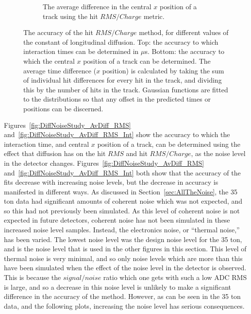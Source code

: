 \begin{figure}
\begin{subfigure}{0.6\textwidth}
    \caption{The average difference in the central $x$ position of a track using the hit $RMS/Charge$ metric.}
    \label{fig:DiffLDiff_AvDiff_RMS_Int_X}
  \end{subfigure}
  \caption[Comparing the accuracy of the hit $RMS$ method, as the constant of longitudinal diffusion changes]
          {The accuracy of the hit $RMS/Charge$ method, for different values of the constant of longitudinal diffusion. Top: the accuracy to which interaction times can be determined in $\mu$s. Bottom: the accuracy to which the central $x$ position of a track can be determined. The average time difference ($x$ position) is calculated by taking the sum of individual hit differences for every hit in the track, and dividing this by the number of hits in the track. Gaussian functions are fitted to the distributions so that any offset in the predicted times or positions can be discerned.}
  \label{fig:DiffLDiff_AvDiff_RMS_Int}
\end{figure}

Figures~\ref{fig:DiffNoiseStudy_AvDiff_RMS} and~\ref{fig:DiffNoiseStudy_AvDiff_RMS_Int} show the accuracy to which the interaction time, and central $x$ position of a track, can be determined using the effect that diffusion has on the hit $RMS$ and hit $RMS/Charge$, as the noise level in the detector changes. Figures~\ref{fig:DiffNoiseStudy_AvDiff_RMS} and~\ref{fig:DiffNoiseStudy_AvDiff_RMS_Int} both show that the accuracy of the fits decrease with increasing noise levels, but the decrease in accuracy is manifested in different ways. As discussed in Section~\ref{sec:AllTheNoise}, the 35 ton data had significant amounts of coherent noise which was not expected, and so this had not previously been simulated. As this level of coherent noise is not expected in future detectors, coherent noise has not been simulated in these increased noise level samples. Instead, the electronics noise, or ``thermal noise,'' has been varied. The lowest noise level was the design noise level for the 35 ton, and is the noise level that is used in the other figures in this section. This level of thermal noise is very minimal, and so only noise levels which are more than this have been simulated when the effect of the noise level in the detector is observed. This is because the $signal/noise$ ratio which one gets with such a low ADC RMS is large, and so a decrease in this noise level is unlikely to make a significant difference in the accuracy of the method. However, as can be seen in the 35 ton data, and the following plots, increasing the noise level has serious consequences. \\


